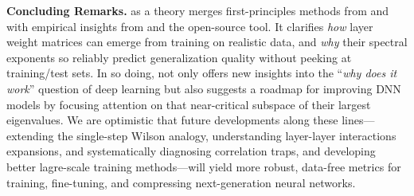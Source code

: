 \vspace{1em}
\noindent
\textbf{Concluding Remarks.}
\SETOL as a \SemiEmpirical theory merges first-principles methods from \STATMECH and \RMT with empirical 
insights from \HTSR and the open-source \WW tool. It clarifies \emph{how} \HeavyTailed  layer weight 
matrices can emerge from training on realistic data, and \emph{why} their spectral exponents so reliably 
predict generalization quality without peeking at training/test sets. In so doing, \SETOL not only offers 
new insights into the “\emph{why does it work}” question of deep learning but also suggests a roadmap for 
improving DNN models by focusing attention on that near-critical subspace of their largest 
eigenvalues. We are optimistic that future developments along these lines---extending the single-step Wilson
\ExactRenormalizationGroup analogy, understanding layer-layer interactions expansions, and systematically diagnosing correlation 
traps, and developing better lagre-scale training methods---will yield more robust, data-free metrics for training, fine-tuning, and compressing next-generation 
neural networks. 
